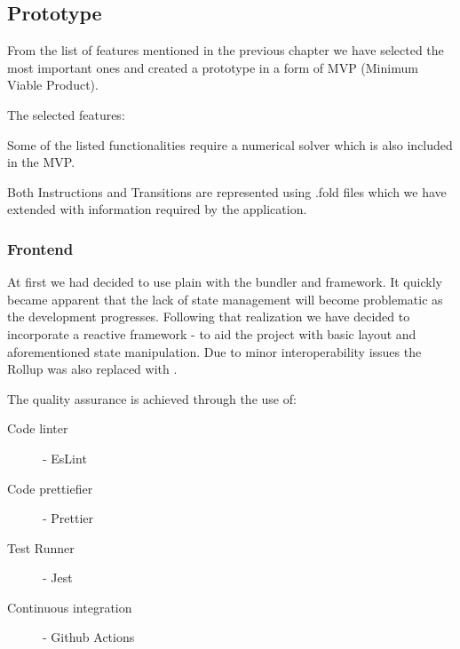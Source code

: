 \subsection{Prototype}

From the list of features mentioned in the previous chapter we have selected the most important ones and created a prototype in a form of MVP (Minimum Viable Product). 

The selected features:

\begin{enumerate}
\end{enumerate}

Some of the listed functionalities require a numerical solver which is also included in the MVP.

Both Instructions and Transitions are represented using .fold files which we have extended with information required by the application.

\subsubsection{Frontend}

At first we had decided to use plain  with the  bundler and  framework.
It quickly became apparent that the lack of state management will become problematic as the development progresses. Following that realization we have decided to incorporate a reactive framework -  to aid the project with basic layout and aforementioned state manipulation. 
Due to minor interoperability issues the Rollup was also replaced with .

The quality assurance is achieved through the use of:

\begin{description}
\item[Code linter] - EsLint
\item[Code prettiefier] - Prettier
\item[Test Runner] - Jest
\item[Continuous integration] - Github Actions
\end{description}

